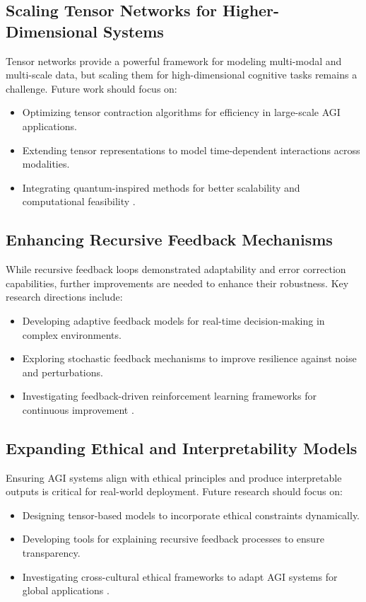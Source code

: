 \documentclass{article}
\theoremstyle{plain}
\begin{document}
\subsection{Scaling Tensor Networks for Higher-Dimensional Systems}
Tensor networks provide a powerful framework for modeling multi-modal and multi-scale data, but scaling them for high-dimensional cognitive tasks remains a challenge. Future work should focus on:
\begin{itemize}
    \item Optimizing tensor contraction algorithms for efficiency in large-scale AGI applications.
    \item Extending tensor representations to model time-dependent interactions across modalities.
    \item Integrating quantum-inspired methods for better scalability and computational feasibility \cite{biamonte2017tensor, preskill2018quantum}.
\end{itemize}

\subsection{Enhancing Recursive Feedback Mechanisms}
While recursive feedback loops demonstrated adaptability and error correction capabilities, further improvements are needed to enhance their robustness. Key research directions include:
\begin{itemize}
    \item Developing adaptive feedback models for real-time decision-making in complex environments.
    \item Exploring stochastic feedback mechanisms to improve resilience against noise and perturbations.
    \item Investigating feedback-driven reinforcement learning frameworks for continuous improvement \cite{wolfram2020feedback}.
\end{itemize}

\subsection{Expanding Ethical and Interpretability Models}
Ensuring AGI systems align with ethical principles and produce interpretable outputs is critical for real-world deployment. Future research should focus on:
\begin{itemize}
    \item Designing tensor-based models to incorporate ethical constraints dynamically.
    \item Developing tools for explaining recursive feedback processes to ensure transparency.
    \item Investigating cross-cultural ethical frameworks to adapt AGI systems for global applications \cite{russell2019humancompatible}.
\end{itemize}
\end{document}
